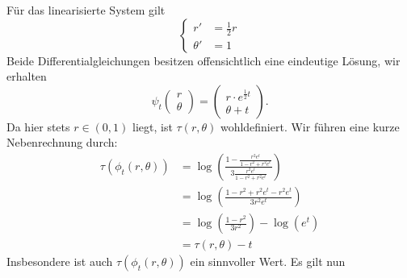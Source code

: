 \documentclass{article}
\begin{document}
\noindent
    Für das linearisierte System gilt
    \[
        \begin{cases}
            r' &= \frac{1}{2} r\\
            \theta' &= 1
        \end{cases}
    \]
    Beide Differentialgleichungen besitzen offensichtlich eine eindeutige Lösung, wir erhalten
    \[
        \psi_t \begin{pmatrix}
            r\\\theta
        \end{pmatrix} = \begin{pmatrix}
            r \cdot e^{\frac{1}{2}t}\\
            \theta + t
        \end{pmatrix}.
    \]
    Da hier stets $r \in (0,1)$ liegt, ist $\tau(r, \theta)$ wohldefiniert.
    Wir führen eine kurze Nebenrechnung durch:
    \begin{align*}
        \tau(\phi_t(r, \theta)) &= \log \left(\frac{1 - \frac{r^2e^t}{1 - r^2 + r^2e^t}}{3\frac{r^2e^t}{1 - r^2 + r^2e^t}}\right)\\
        &= \log \left(\frac{1 - r^2 + r^2e^t - r^2 e^t}{3r^2e^t}\right)\\
        &= \log\left(\frac{1 - r^2}{3r^2}\right) - \log(e^t)\\
        &= \tau(r, \theta) - t
    \end{align*}
    Insbesondere ist auch $\tau(\phi_t(r, \theta))$ ein sinnvoller Wert.
    Es gilt nun
\end{document}
